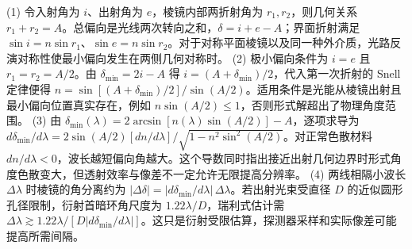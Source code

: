 (1) 令入射角为 \(i\)、出射角为 \(e\)，棱镜内部两折射角为 \(r_1,r_2\)，则几何关系 \(r_1+r_2=A\)。总偏向是光线两次转向之和，\(\delta=i+e-A\)；界面折射满足 \(\sin i=n\sin r_1\)、\(\sin e=n\sin r_2\)。对于对称平面棱镜以及同一种外介质，光路反演对称性使最小偏向发生在两侧几何对称时。
(2) 极小偏向条件为 \(i=e\) 且 \(r_1=r_2=A/2\)。由 \(\delta_{\min}=2i-A\) 得 \(i=(A+\delta_{\min})/2\)，代入第一次折射的 Snell 定律便得 \(n=\sin[(A+\delta_{\min})/2]/\sin(A/2)\)。适用条件是光能从棱镜出射且最小偏向位置真实存在，例如 \(n\sin(A/2)\le1\)，否则形式解超出了物理角度范围。
(3) 由 \(\delta_{\min}(\lambda)=2\arcsin[n(\lambda)\sin(A/2)]-A\)，逐项求导为 \(d\delta_{\min}/d\lambda=2\sin(A/2)[dn/d\lambda]/\sqrt{1-n^2\sin^2(A/2)}\)。对正常色散材料 \(dn/d\lambda<0\)，波长越短偏向角越大。这个导数同时指出接近出射几何边界时形式角度色散变大，但透射效率与像差不一定允许无限提高分辨率。
(4) 两线相隔小波长 \(\Delta\lambda\) 时棱镜的角分离约为 \(|\Delta\delta|=|d\delta_{\min}/d\lambda|\,\Delta\lambda\)。若出射光束受直径 \(D\) 的近似圆形孔径限制，衍射首暗环角尺度为 \(1.22\lambda/D\)，瑞利式估计需 \(\Delta\lambda\gtrsim1.22\lambda/[D|d\delta_{\min}/d\lambda|]\)。这只是衍射受限估算，探测器采样和实际像差可能提高所需间隔。
